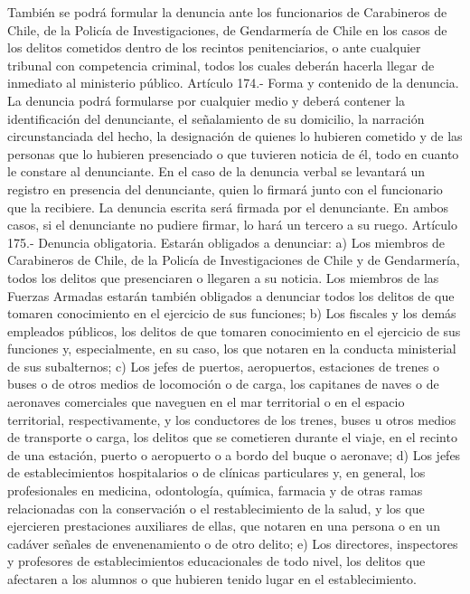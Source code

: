     También se podrá formular la denuncia ante los funcionarios de Carabineros de Chile, de la Policía de Investigaciones, de Gendarmería de Chile en los casos de los delitos cometidos dentro de los recintos penitenciarios, o ante cualquier tribunal con competencia criminal, todos los cuales deberán hacerla llegar de inmediato al ministerio público.
    Artículo 174.- Forma y contenido de la denuncia. La denuncia podrá formularse por cualquier medio y deberá contener la identificación del denunciante, el señalamiento de su domicilio, la narración circunstanciada del hecho, la designación de quienes lo hubieren cometido y de las personas que lo hubieren presenciado o que tuvieren noticia de él, todo en cuanto le constare al denunciante.
    En el caso de la denuncia verbal se levantará un registro en presencia del denunciante, quien lo firmará junto con el funcionario que la recibiere. La denuncia escrita será firmada por el denunciante. En ambos casos, si el denunciante no pudiere firmar, lo hará un tercero a su ruego.
    Artículo 175.- Denuncia obligatoria. Estarán obligados a denunciar:
    a) Los miembros de Carabineros de Chile, de la Policía de Investigaciones de Chile y de Gendarmería, todos los delitos que presenciaren o llegaren a su noticia. Los miembros de las Fuerzas Armadas estarán también obligados a denunciar todos los delitos de que tomaren conocimiento en el ejercicio de sus funciones;
    b) Los fiscales y los demás empleados públicos, los delitos de que tomaren conocimiento en el ejercicio de sus funciones y, especialmente, en su caso, los que notaren en la conducta ministerial de sus subalternos;
    c) Los jefes de puertos, aeropuertos, estaciones de trenes o buses o de otros medios de locomoción o de carga, los capitanes de naves o de aeronaves comerciales que naveguen en el mar territorial o en el espacio territorial, respectivamente, y los conductores de los trenes, buses u otros medios de transporte o carga, los delitos que se cometieren durante el viaje, en el recinto de una estación, puerto o aeropuerto o a bordo del buque o aeronave;
    d) Los jefes de establecimientos hospitalarios o de clínicas particulares y, en general, los profesionales en medicina, odontología, química, farmacia y de otras ramas relacionadas con la conservación o el restablecimiento de la salud, y los que ejercieren prestaciones auxiliares de ellas, que notaren en una persona o en un cadáver señales de envenenamiento o de otro delito;
    e) Los directores, inspectores y profesores de establecimientos educacionales de todo nivel, los delitos que afectaren a los alumnos o que hubieren tenido lugar en el establecimiento.
